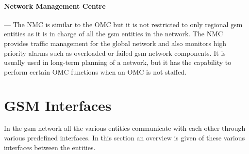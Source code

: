 \paragraph{Network Management Centre}
--- The \gls{NMC} is similar to the \gls{OMC} but it is not restricted to only regional \gls{gsm} entities as it is in charge of all the \gls{gsm} entities in the network. The \gls{NMC} provides traffic management for the global network and also monitors high priority alarms such as overloaded or failed \gls{gsm} network components. It is usually used in long-term planning of a network, but it has the capability to perform certain \gls{OMC} functions when an \gls{OMC} is not staffed. 

\section{GSM Interfaces}
\label{sec:gsminterfaces}
In the \gls{gsm} network all the various entities communicate with each other through various predefined interfaces. In this section an overview is given of these various interfaces between the entities.
